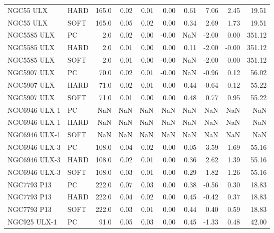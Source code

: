 \begin{tabular}{llrrrrrrrr}
         NGC55 ULX &  HARD &  165.0 &  0.02 & 0.01 &      0.00 &   0.61 &      7.06 &  2.45 &        19.51 \\
         NGC55 ULX &  SOFT &  165.0 &  0.05 & 0.02 &      0.00 &   0.34 &      2.69 &  1.73 &        19.51 \\
       NGC5585 ULX &    PC &    2.0 &  0.02 & 0.00 &     -0.00 &    NaN &     -2.00 &  0.00 &       351.12 \\
       NGC5585 ULX &  HARD &    2.0 &  0.01 & 0.00 &      0.00 &   0.11 &     -2.00 & -0.00 &       351.12 \\
       NGC5585 ULX &  SOFT &    2.0 &  0.01 & 0.00 &     -0.00 &    NaN &     -2.00 &  0.00 &       351.12 \\
       NGC5907 ULX &    PC &   70.0 &  0.02 & 0.01 &     -0.00 &    NaN &     -0.96 &  0.12 &        56.02 \\
       NGC5907 ULX &  HARD &   71.0 &  0.02 & 0.01 &      0.00 &   0.44 &     -0.64 &  0.12 &        55.22 \\
       NGC5907 ULX &  SOFT &   71.0 &  0.01 & 0.00 &      0.00 &   0.48 &      0.77 &  0.95 &        55.22 \\
     NGC6946 ULX-1 &    PC &    NaN &   NaN &  NaN &       NaN &    NaN &       NaN &   NaN &          NaN \\
     NGC6946 ULX-1 &  HARD &    NaN &   NaN &  NaN &       NaN &    NaN &       NaN &   NaN &          NaN \\
     NGC6946 ULX-1 &  SOFT &    NaN &   NaN &  NaN &       NaN &    NaN &       NaN &   NaN &          NaN \\
     NGC6946 ULX-3 &    PC &  108.0 &  0.04 & 0.02 &      0.00 &   0.05 &      3.59 &  1.69 &        55.16 \\
     NGC6946 ULX-3 &  HARD &  108.0 &  0.02 & 0.01 &      0.00 &   0.36 &      2.62 &  1.39 &        55.16 \\
     NGC6946 ULX-3 &  SOFT &  108.0 &  0.03 & 0.01 &      0.00 &   0.29 &      1.82 &  1.26 &        55.16 \\
       NGC7793 P13 &    PC &  222.0 &  0.07 & 0.03 &      0.00 &   0.38 &     -0.56 &  0.30 &        18.83 \\
       NGC7793 P13 &  HARD &  222.0 &  0.04 & 0.02 &      0.00 &   0.45 &     -0.42 &  0.37 &        18.83 \\
       NGC7793 P13 &  SOFT &  222.0 &  0.03 & 0.01 &      0.00 &   0.44 &      0.40 &  0.59 &        18.83 \\
      NGC925 ULX-1 &    PC &   91.0 &  0.05 & 0.03 &      0.00 &   0.45 &     -1.33 &  0.48 &        42.00 \\

\end{tabular}
